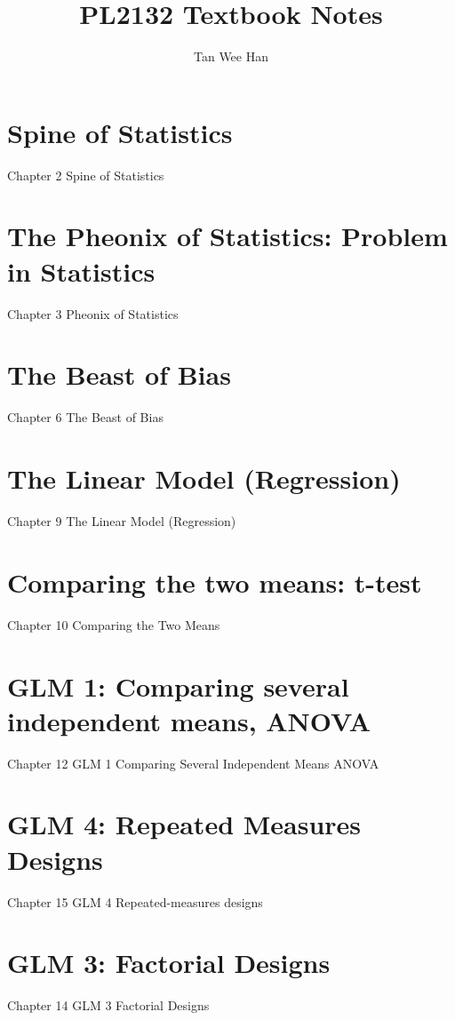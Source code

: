 \documentclass[a4paper, 12pt]{book}
\begin{document}
\title{\Large{\textbf{PL2132 Textbook Notes}}}
\author{Tan Wee Han}
\maketitle

\let\cleardoublepage\clearpage
\tableofcontents

\pagestyle{plain} %

\chapter{Spine of Statistics}
{Chapter 2 Spine of Statistics}

\chapter{The Pheonix of Statistics: Problem in Statistics}
{Chapter 3 Pheonix of Statistics}

\chapter{The Beast of Bias}
{Chapter 6 The Beast of Bias}

\chapter{The Linear Model (Regression)}  %
{Chapter 9 The Linear Model (Regression)}

\chapter{Comparing the two means: t-test}
{Chapter 10 Comparing the Two Means}

\chapter{GLM 1: Comparing several independent means, ANOVA}
{Chapter 12 GLM 1 Comparing Several Independent Means ANOVA}

\chapter{GLM 4: Repeated Measures Designs}
{Chapter 15 GLM 4 Repeated-measures designs}

\chapter{GLM 3: Factorial Designs}
{Chapter 14 GLM 3 Factorial Designs}
\end{document}
